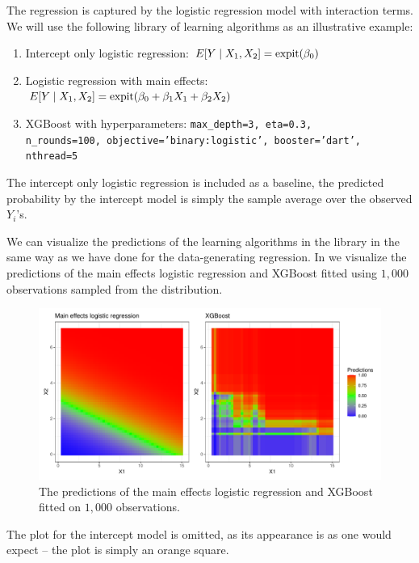 \documentclass[./main.tex]{subfiles}
\begin{document}
The regression is captured by the logistic regression model with interaction terms. We will use the following library of learning algorithms as an illustrative example:
\begin{enumerate}
    \item Intercept only logistic regression: $E[Y \mid X_1, X_2] = \operatorname{expit}(\beta_0)$
    \item Logistic regression with main effects: $E[Y \mid X_1, X_2] = \operatorname{expit}(\beta_0 + \beta_1 X_1 + \beta_2 X_2)$
    \item XGBoost with hyperparameters: \texttt{max\_depth=3, eta=0.3,\\ n\_rounds=100, objective='binary:logistic', booster='dart', nthread=5}
\end{enumerate}
The intercept only logistic regression is included as a baseline, the predicted probability by the intercept model is simply the sample average over the observed $ Y_i$'s. 

We can visualize the predictions of the learning algorithms in the library in the same way as we have done for the data-generating regression. In  we visualize the predictions of the main effects logistic regression and XGBoost fitted using $1,000 $  observations sampled from the distribution. 
\begin{figure}
    \centering
    \includegraphics[width=\textwidth]{figures/predictpar.pdf}
    \caption{The predictions of the main effects logistic regression and XGBoost fitted on $ 1,000 $ observations.}
    \label{fig:predictpar}
\end{figure}
The plot for the intercept model is omitted, as its appearance is as one would expect -- the plot is simply an orange square. 
\end{document}

